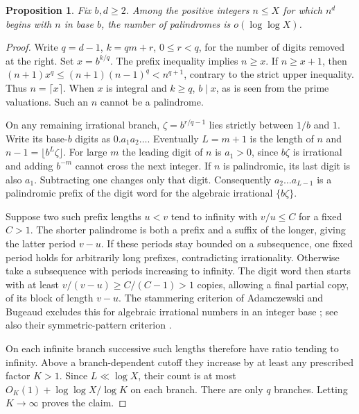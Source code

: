 \documentclass[11pt,reqno,a4paper]{amsart}
\newtheorem{proposition}[theorem]{Proposition}
\theoremstyle{remark}
\begin{document}
\begin{proposition}\label{prop:palindromes}
Fix \(b,d\ge2\). Among the positive integers \(n\le X\) for which
\(n^d\) begins with \(n\) in base \(b\), the number of palindromes
is \(o(\log\log X)\).
\end{proposition}
\begin{proof}
Write \(q=d-1\), \(k=qm+r\), \(0\le r<q\), for the number of digits
removed at the right. Set \(x=b^{k/q}\). The prefix inequality implies
\(n\ge x\). If \(n\ge x+1\), then
\((n+1)x^q\le(n+1)(n-1)^q<n^{q+1}\), contrary to the strict upper
inequality. Thus \(n=\lceil x\rceil\). When \(x\) is integral and
\(k\ge q\), \(b\mid x\), as is seen from the prime valuations.
Such an \(n\) cannot be a palindrome.

On any remaining irrational branch,
\(\zeta=b^{r/q-1}\) lies strictly between \(1/b\) and \(1\).
Write its base-\(b\) digits as \(0.a_1a_2\ldots\).
Eventually \(L=m+1\) is the length of \(n\) and
\(n-1=\lfloor b^L\zeta\rfloor\). For large \(m\) the leading digit
of \(n\) is \(a_1>0\), since \(b\zeta\) is irrational and adding
\(b^{-m}\) cannot cross the next integer. If \(n\) is palindromic,
its last digit is also \(a_1\). Subtracting one changes only that
digit. Consequently \(a_2\ldots a_{L-1}\) is a palindromic prefix of
the digit word for the algebraic irrational \(\{b\zeta\}\).

Suppose two such prefix lengths \(u<v\) tend to infinity with
\(v/u\le C\) for a fixed \(C>1\). The shorter palindrome is both
a prefix and a suffix of the longer, giving the latter period \(v-u\).
If these periods stay bounded on a subsequence, one fixed period holds
for arbitrarily long prefixes, contradicting irrationality. Otherwise
take a subsequence with periods increasing to infinity. The digit word
then starts with at least \(v/(v-u)\ge C/(C-1)>1\) copies, allowing
a final partial copy, of its block of length \(v-u\). The stammering
criterion of Adamczewski and Bugeaud excludes this for algebraic
irrational numbers in an integer base
\cite[Theorem~5]{rev-complexity}; see also their symmetric-pattern
criterion \cite[Theorem~4 and \S6]{pol-sym}.

On each infinite branch successive such lengths therefore have ratio
tending to infinity. Above a branch-dependent cutoff they increase
by at least any prescribed factor \(K>1\). Since \(L\ll\log X\),
their count is at most \(O_K(1)+\log\log X/\log K\) on each branch.
There are only \(q\) branches. Letting \(K\to\infty\) proves the claim.
\end{proof}
\end{document}
